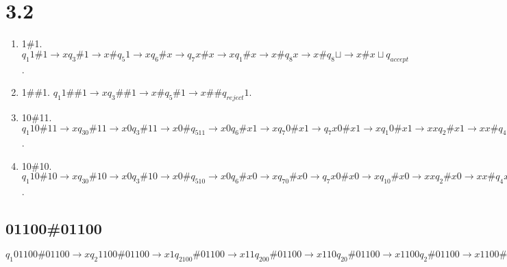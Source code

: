 \documentclass{scrartcl}
\newcommand{\bl}{{\sqcup}}
\begin{document}
\section*{3.2}

\begin{enumerate}
	
	\item[b.]1\#1. \qquad $q_1 1\#1 \to xq_3 \# 1 \to x\# q_5 1 \to xq_6 \#x \to q_7 x \# x \to xq_1 \# x \to x\#q_8 x \to x\#q_8 \bl \to x\#x{\bl}q_{accept}  $.
	\item[c.]1\#\#1. \qquad $q_1 1\#\#1 \to xq_3 \#\#1 \to x\#q_5\#1 \to x\#\#q_{reject}1$.
	\item[d.]10\#11. \qquad $q_1 10\#11 \to xq_30\#11 \to x0q_3\#11 \to x0\#q_511 \to x0q_6\#x1 \to xq_7 0 \#x1 \to q_7 x 0\#x1 \to xq_1 0 \#x1 \to xxq_2\#x1 \to xx\#q_4 x1 \to xx\#xq_4 1\to xx\#x1q_{reject} \bl $.
	\item[e.]10\#10. \qquad $q_1 10\#10 \to xq_30\#10 \to x0q_3\#10 \to x0\#q_510 \to x0q_6\#x0 \to xq_70\#x0 \to q_7x0\#x0 \to xq_10\#x0 \to xxq_2\#x0 \to xx\#q_4x0 \to xx\#xq_40 \to xx\#q_6xx \to xxq_6\#xx \to xq_7x\#xx \to xq_7x\#xx \to xxq_1\#xx \to xx\#q_8 xx \to xx\#xq_8 x \to xx\#xxq_8 \bl \to xx\#xx \bl q_{accept}  $.
\end{enumerate}

\subsection*{01100\#01100}
$q_1 01100\#01100 \to xq_2 1100\#01100 \to x1q_2100\#01100 \to x11q_200\#01100
\to x110q_20\#01100 \to x1100q_2\#01100 \to x1100\#q_401100 \to x1100q_6\#x1100
\to x110q_70\#x1100 \to x11q_700\#x1100 \to x1q_7100\#x1100 \to xq_71100\#x1100
\to q_7x1100\#x1100 \to xq_11100\#x1100 \to xxq_3100\#x1100 \to xx1q_300\#x1100
\to xx10q_30\#x1100 \to xx100q_3\#x1100 \to xx100\#q_5x1100 \to xx100\#xq_51100
\to xx100\#q_6xx100 \to xx100q_6\#xx100 \to xx10q_70\#xx100 \to xx1q_700\#xx100
\to xxq_7100\#xx100 \to xq_7x100\#xx100 \to xxq_1100\#xx100 \to xxxq_300\#xx100
\to xxx0q_30\#xx100 \to xxx00q_3\#xx100 \to xxx00\#q_5xx100 \to xxx00\#xq_5x100
\to xxx00\#xxq_5100 \to xxx00\#xq_6xx00 \to xxx00\#q_6xxx00 \to xxx00q_6\#xxx00
\to xxx0q_70\#xxx00 \to xxxq_700\#xxx00 \to xxq_7x00\#xxx00 \to xxxq_100\#xxx00
\to xxxxq_20\#xxx00 \to xxxx0q_2\#xxx00 \to xxxx0\#q_4xxx00 \to xxxx0\#xq_4xx00
\to xxxx0\#xxq_4x00 \to xxxx0\#xxxq_400 \to xxxx0\#xxq_6xx0 \to xxxx0\#xq_6xxx0
\to xxxx0\#q_6xxxx0 \to xxxx0q_6\#xxxx0 \to xxxxq_70\#xxxx0 \to xxxq_7x0\#xxxx0
\to xxxxq_10\#xxxx0 \to xxxxxq_2\#xxxx0 \to xxxxx\#q_4xxxx0 \to xxxxx\#xq_4xxx0
\to xxxxx\#xxq_4xx0 \to xxxxx\#xxxq_4x0 \to xxxxx\#xxxxq_40 \to xxxxx\#xxxq_6xx
\to xxxxx\#xxq_6xxx \to xxxxx\#xq_6xxxx \to xxxxx\#q_6xxxxx \to xxxxxq_6\#xxxxx
\to xxxxq_7x\#xxxxx \to xxxxxq_1\#xxxxx \to xxxxx\#q_8xxxxx \to xxxxx\#xq_8xxxx
\to xxxxx\#xxq_8xxx \to xxxxx\#xxxq_8xx \to xxxxx\#xxxxq_8x \to xxxxx\#xxxxxq_8\bl
\to xxxxx\#xxxxx\bl q_{acccept} $
\end{document}
